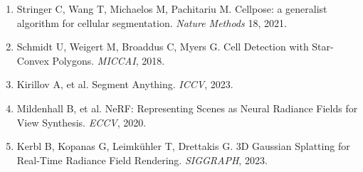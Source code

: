 \documentclass[11pt,a4paper,twoside,openright]{book}
\begin{document}
{\begin{enumerate}[leftmargin=2em]
\item Stringer C, Wang T, Michaelos M, Pachitariu M. Cellpose: a generalist algorithm for cellular segmentation. \emph{Nature Methods} 18, 2021.
\item Schmidt U, Weigert M, Broaddus C, Myers G. Cell Detection with Star-Convex Polygons. \emph{MICCAI}, 2018.
\item Kirillov A, et al. Segment Anything. \emph{ICCV}, 2023.
\item Mildenhall B, et al. NeRF: Representing Scenes as Neural Radiance Fields for View Synthesis. \emph{ECCV}, 2020.
\item Kerbl B, Kopanas G, Leimkühler T, Drettakis G. 3D Gaussian Splatting for Real-Time Radiance Field Rendering. \emph{SIGGRAPH}, 2023.
\end{enumerate}
}
\end{document}
